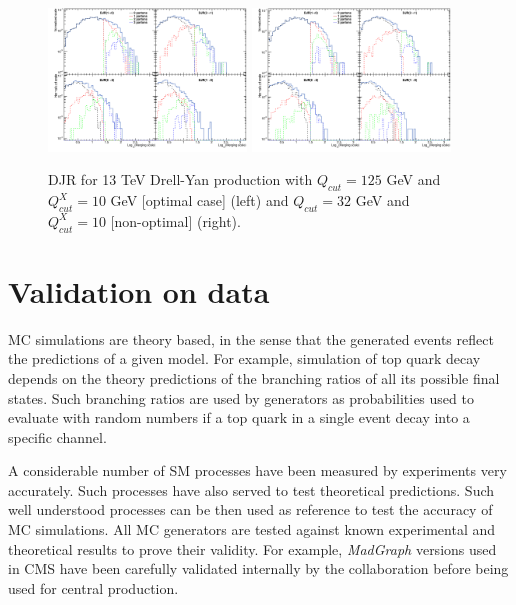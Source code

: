 \begin{figure}[!Hhtbp]
  \begin{center}
    \includegraphics[width=0.47\textwidth]{figs/DJR_q25_xq10_DYJets13TeV.png}
    \includegraphics[width=0.47\textwidth]{figs/DJR_q32_xq10_DYJets13TeV.png}
    \caption{DJR for 13 TeV Drell-Yan production with $Q_{cut}=125$ GeV and $Q^{X}_{cut}=10$ GeV [optimal case] (left) and $Q_{cut}=32$ GeV and $Q^{X}_{cut}=10$ [non-optimal] (right).}
    \label{fig:DYMerging}
  \end{center}
\end{figure}

\section{Validation on data}
\label{sec:val}

MC simulations are theory based, in the sense that the generated events reflect the predictions of a given model. For example, simulation of top quark decay depends on the theory predictions of the branching ratios of all its possible final states. Such branching ratios are used by generators as probabilities used to evaluate with random numbers if a top quark in a single event decay into a specific channel. 

A considerable number of SM processes have been measured by experiments very accurately. Such processes have also served to test theoretical predictions. Such well understood processes can be then used as reference to test the accuracy of MC simulations. All MC generators are tested against known experimental and theoretical results to prove their validity. For example, \textit{MadGraph} versions used in CMS have been carefully validated internally by the collaboration before being used for central production.

